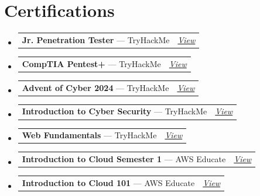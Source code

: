 \documentclass[11pt,a4paper]{article}
\makeatletter
\newcommand{\resumePOR}[3]{
  \vspace{-6pt}\item
  \begin{tabular*}{\textwidth}[t]{l@{\extracolsep{\fill}}r}
    \textbf{#1} \hspace{1mm} \small{#2} & \small\textit{#3}
  \end{tabular*}
  \vspace{-3pt}
}
\newcommand{\resumeSubHeadingListStart}{\begin{itemize}[leftmargin=*,labelsep=0mm,itemsep=0pt]}
\newcommand{\resumeSubHeadingListEnd}{\end{itemize}\vspace{1mm}}
\makeatother
\begin{document}
\section{Certifications}
\resumeSubHeadingListStart
  \resumePOR{Jr. Penetration Tester}{--- TryHackMe}
    {\href{https://tryhackme-certificates.s3-eu-west-1.amazonaws.com/THM-EVC7DTCYWJ.pdf}{\textcolor{accent}{View}}}
  \resumePOR{CompTIA Pentest+}{--- TryHackMe}
    {\href{https://tryhackme-certificates.s3-eu-west-1.amazonaws.com/THM-9YN8F6SLAJ.pdf}{\textcolor{accent}{View}}}
  \resumePOR{Advent of Cyber 2024}{--- TryHackMe}
    {\href{https://tryhackme-certificates.s3-eu-west-1.amazonaws.com/THM-KCYOBBMWKV.pdf}{\textcolor{accent}{View}}}
  \resumePOR{Introduction to Cyber Security}{--- TryHackMe}
    {\href{https://tryhackme-certificates.s3-eu-west-1.amazonaws.com/THM-VDDWDT8NWY.pdf}{\textcolor{accent}{View}}}
  \resumePOR{Web Fundamentals}{--- TryHackMe}
    {\href{https://tryhackme-certificates.s3-eu-west-1.amazonaws.com/THM-NLQ4QFBFJZ.pdf}{\textcolor{accent}{View}}}
  \resumePOR{Introduction to Cloud Semester 1}{--- AWS Educate}
    {\href{https://www.credly.com/badges/5c61ac7a-62f5-4728-954e-5d3fc481cc9b/public_url}{\textcolor{accent}{View}}}
  \resumePOR{Introduction to Cloud 101}{--- AWS Educate}
    {\href{https://www.credly.com/badges/d6837af8-9e13-47fc-b375-928fe63768f2/public_url}{\textcolor{accent}{View}}}
\resumeSubHeadingListEnd

\end{document}
